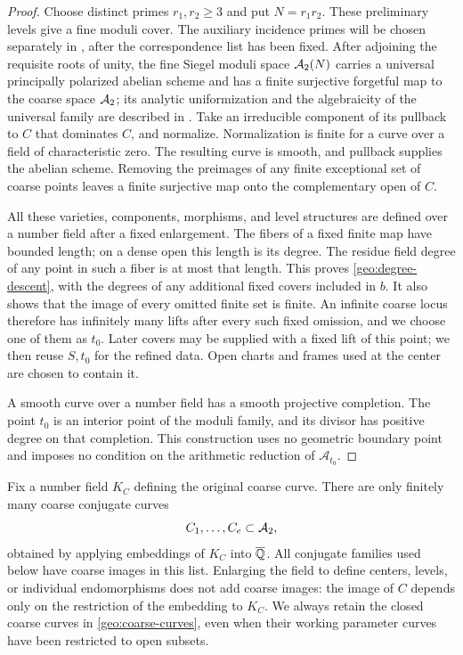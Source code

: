 \begin{proof}
Choose distinct primes $r_1,r_2\geq3$ and put $N=r_1r_2$.
These preliminary levels give a fine moduli cover.  The auxiliary
incidence primes will be chosen separately in ,
after the correspondence list has been fixed.
After adjoining the requisite roots of unity, the fine Siegel moduli
space $\mathcal A_2(N)$ carries a universal principally polarized abelian
scheme and has a finite surjective forgetful map to the coarse space
$\mathcal A_2$; its analytic uniformization and the algebraicity of the
universal family are described in
\cite[Theorem~4.6 and Corollary~4.7]{MilneModuli2013}.
Take an irreducible component of its pullback to $C$ that
dominates $C$, and normalize.  Normalization is finite for a curve over
a field of characteristic zero.  The resulting curve is smooth, and
pullback supplies the abelian scheme.  Removing the preimages of any
finite exceptional set of coarse points leaves a finite surjective map
onto the complementary open of $C$.

All these varieties, components, morphisms, and level structures are
defined over a number field after a fixed enlargement.  The fibers of
a fixed finite map have bounded length; on a dense open this length is
its degree.  The residue field degree of any point in such a fiber is
at most that length.  This proves \eqref{geo:degree-descent}, with the
degrees of any additional fixed covers included in $b$.  It also shows
that the image of every omitted finite set is finite.  An infinite
coarse locus therefore has infinitely many lifts after every such
fixed omission, and we choose one of them as $t_0$.  Later covers may
be supplied with a fixed lift of this point; we then reuse $S,t_0$ for
the refined data.  Open charts and frames used at the center are
chosen to contain it.

A smooth curve over a number field has a smooth projective completion.
The point $t_0$ is an interior point of the moduli family, and its
divisor has positive degree on that completion.  This construction
uses no geometric boundary point and imposes no condition on the
arithmetic reduction of $\mathscr A_{t_0}$.
\end{proof}

Fix a number field $K_C$ defining the original coarse curve.  There
are only finitely many coarse conjugate curves
\begin{equation}\label{geo:coarse-curves}
 C_1,\ldots,C_e\subset\mathcal A_2,
\end{equation}
obtained by applying embeddings of $K_C$ into $\overline{\mathbb Q}$.  All conjugate
families used below have coarse images in this list.  Enlarging the
field to define centers, levels, or individual endomorphisms does not
add coarse images: the image of $C$ depends only on the restriction
of the embedding to $K_C$.  We always retain the closed coarse curves
in \eqref{geo:coarse-curves}, even when their working parameter curves
have been restricted to open subsets.

